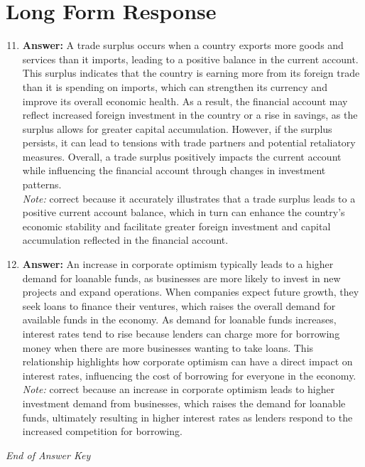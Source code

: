 \documentclass[12pt]{article}
\begin{document}
\section*{Long Form Response}
\begin{enumerate}[label=\arabic*.]
\setcounter{enumi}{10}
\item \textbf{Answer:} A trade surplus occurs when a country exports more goods and services than it imports, leading to a positive balance in the current account. This surplus indicates that the country is earning more from its foreign trade than it is spending on imports, which can strengthen its currency and improve its overall economic health. As a result, the financial account may reflect increased foreign investment in the country or a rise in savings, as the surplus allows for greater capital accumulation. However, if the surplus persists, it can lead to tensions with trade partners and potential retaliatory measures. Overall, a trade surplus positively impacts the current account while influencing the financial account through changes in investment patterns.
\\ \textit{Note:} correct because it accurately illustrates that a trade surplus leads to a positive current account balance, which in turn can enhance the country's economic stability and facilitate greater foreign investment and capital accumulation reflected in the financial account.
\item \textbf{Answer:} An increase in corporate optimism typically leads to a higher demand for loanable funds, as businesses are more likely to invest in new projects and expand operations. When companies expect future growth, they seek loans to finance their ventures, which raises the overall demand for available funds in the economy. As demand for loanable funds increases, interest rates tend to rise because lenders can charge more for borrowing money when there are more businesses wanting to take loans. This relationship highlights how corporate optimism can have a direct impact on interest rates, influencing the cost of borrowing for everyone in the economy.
\\ \textit{Note:} correct because an increase in corporate optimism leads to higher investment demand from businesses, which raises the demand for loanable funds, ultimately resulting in higher interest rates as lenders respond to the increased competition for borrowing.
\end{enumerate}

\vfill
\noindent\textit{End of Answer Key}
\end{document}
